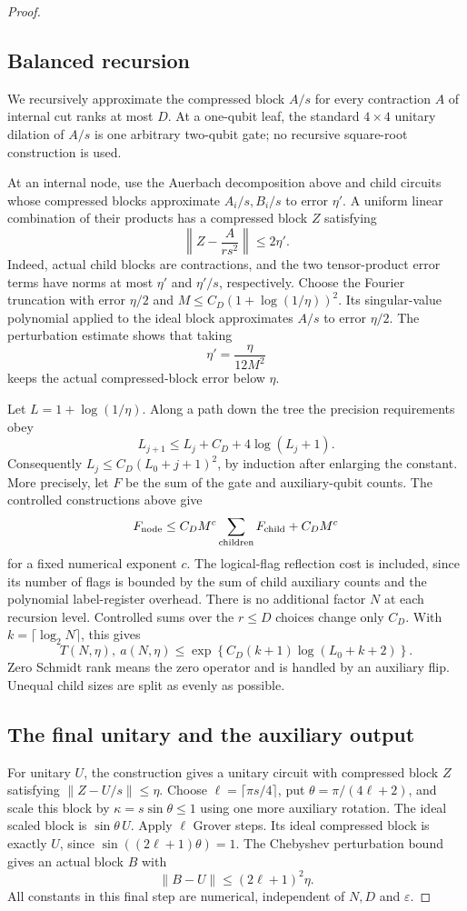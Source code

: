 \documentclass[11pt]{article}
\begin{document}
\begin{proof}
\subsection{Balanced recursion}

We recursively approximate the compressed block $A/s$ for every
contraction $A$ of internal cut ranks at most $D$. At a one-qubit leaf,
the standard $4\times4$ unitary dilation of $A/s$ is one arbitrary
two-qubit gate; no recursive square-root construction is used.

At an internal node, use the Auerbach decomposition above and child
circuits whose compressed blocks approximate $A_i/s,B_i/s$ to error
$\eta'$. A uniform linear combination of their products has a
compressed block $Z$ satisfying
\[
 \left\|Z-\frac{A}{rs^2}\right\|\leq2\eta'.
\]
Indeed, actual child blocks are contractions, and the two tensor-product
error terms have norms at most $\eta'$ and $\eta'/s$, respectively.
Choose the Fourier truncation with error $\eta/2$ and
$M\leq C_D(1+\log(1/\eta))^2$. Its singular-value polynomial applied
to the ideal block approximates $A/s$ to error $\eta/2$.
The perturbation estimate shows that taking
\[
 \eta'=\frac{\eta}{12M^2}
\]
keeps the actual compressed-block error below $\eta$.

Let $L=1+\log(1/\eta)$. Along a path down the tree the precision
requirements obey
\[
 L_{j+1}\leq L_j+C_D+4\log(L_j+1).
\]
Consequently $L_j\leq C_D(L_0+j+1)^2$, by induction after enlarging
the constant. More precisely, let $F$ be the sum of the gate and
auxiliary-qubit counts. The controlled constructions above give
\[
 F_{\rm node}\leq C_D M^c\sum_{\rm children}F_{\rm child}
                  +C_D M^c
\]
for a fixed numerical exponent $c$. The logical-flag reflection cost
is included, since its number of flags is bounded by the sum of
child auxiliary counts and the polynomial label-register overhead.
There is no additional factor $N$ at each recursion level.
Controlled sums over the $r\leq D$ choices change only $C_D$.
With $k=\lceil\log_2N\rceil$, this gives
\[
 T(N,\eta),\ a(N,\eta)
 \leq \exp\!\left\{C_D (k+1)\log(L_0+k+2)\right\}.
\]
Zero Schmidt rank means the zero operator and is handled by an auxiliary
flip. Unequal child sizes are split as evenly as possible.

\subsection{The final unitary and the auxiliary output}

For unitary $U$, the construction gives a unitary circuit with
compressed block $Z$ satisfying $\|Z-U/s\|\leq\eta$.
Choose $\ell=\lceil\pi s/4\rceil$, put
$\theta=\pi/(4\ell+2)$, and scale this block by
$\kappa=s\sin\theta\leq1$ using one more auxiliary rotation.
The ideal scaled block is $\sin\theta\,U$. Apply $\ell$ Grover
steps. Its ideal compressed block is exactly $U$, since
$\sin((2\ell+1)\theta)=1$.
The Chebyshev perturbation bound gives an actual block $B$ with
\[
 \|B-U\|\leq(2\ell+1)^2\eta.
\]
All constants in this final step are numerical, independent of $N,D$
and $\varepsilon$.


\end{proof}
\end{document}
